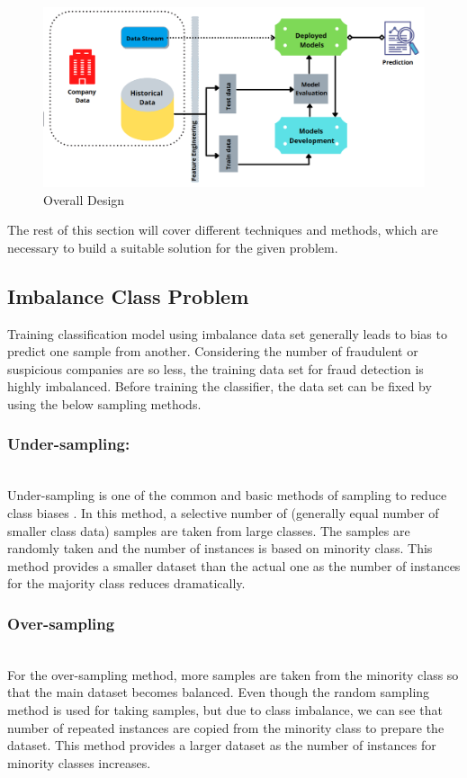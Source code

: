 \begin{figure}[ht]
    \centering
    \includegraphics[width=\linewidth]{figures/overall_design.PNG}
    \caption{Overall Design}
    \label{fig:flow}
\end{figure}

The rest of this section will cover different techniques and methods, which are necessary to build a suitable solution for the given problem. 



\subsection{Imbalance Class Problem}\label{subsec:imbalance-class-problem}
Training classification model using imbalance data set generally leads to bias to predict one sample from another. Considering the number of fraudulent or suspicious companies are so less, the training data set for fraud detection is highly imbalanced. Before training the classifier, the data set can be fixed by using the below sampling methods.  

\subsubsection{Under-sampling:}\hspace*{\fill} \\
Under-sampling is one of the common and basic methods of sampling to reduce class biases \cite{10.1145/3055635.3056643}. In this method, a selective number of (generally equal number of smaller class data) samples are taken from large classes. The samples are randomly taken and the number of instances is based on minority class. This method provides a smaller dataset than the actual one as the number of instances for the majority class reduces dramatically. 

\subsubsection{Over-sampling}\hspace*{\fill} \\
For the over-sampling method, more samples are taken from the minority class so that the main dataset becomes balanced. Even though the random sampling method is used for taking samples, but due to class imbalance, we can see that number of repeated instances are copied from the minority class to prepare the dataset. This method provides a larger dataset as the number of instances for minority classes increases. 

